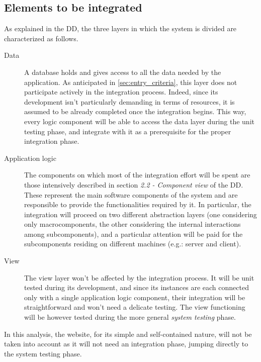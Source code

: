 \subsection{Elements to be integrated}
\label{sec:elements_to_be_integrated}
	As explained in the DD, the three layers in which the system is divided are characterized as follows.
	\begin{description}
		\item[Data] A database holds and gives access to all the data needed by the application. As anticipated in \autoref{sec:entry_criteria}, this layer does not participate actively in the integration process. Indeed, since its development isn't particularly demanding in terms of resources, it is assumed to be already completed once the integration begins. This way, every logic component will be able to access the data layer during the unit testing phase, and integrate with it as a prerequisite for the proper integration phase.
		\item[Application logic] The components on which most of the integration effort will be spent are those intensively described in section \textit{2.2 - Component view} of the DD. These represent the main software components of the system and are responsible to provide the functionalities required by it. In particular, the integration will proceed on two different abstraction layers (one considering only macrocomponents, the other considering the internal interactions among subcomponents), and a particular attention will be paid for the subcomponents residing on different machines (e.g.: server and client).
		\item[View] The view layer won't be affected by the integration process. It will be unit tested during its development, and since its instances are each connected only with a single application logic component, their integration will be straightforward and won't need a delicate testing. The view functioning will be however tested during the more general \textit{system testing} phase. %
	\end{description}
	In this analysis, the website, for its simple and self-contained nature, will not be taken into account as it will not need an integration phase, jumping directly to the system testing phase.	\newline

